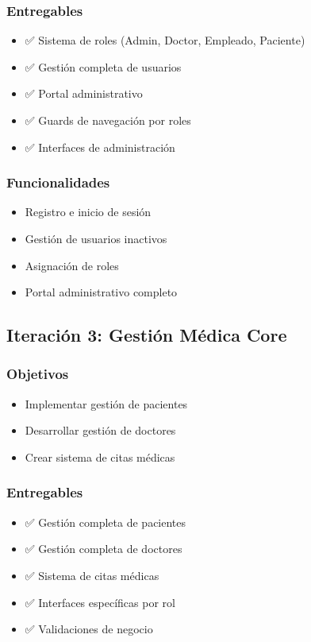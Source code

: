\documentclass[12pt,a4paper]{article}
\begin{document}
\subsubsection{Entregables}
\begin{itemize}
    \item ✅ Sistema de roles (Admin, Doctor, Empleado, Paciente)
    \item ✅ Gestión completa de usuarios
    \item ✅ Portal administrativo
    \item ✅ Guards de navegación por roles
    \item ✅ Interfaces de administración
\end{itemize}

\subsubsection{Funcionalidades}
\begin{itemize}
    \item Registro e inicio de sesión
    \item Gestión de usuarios inactivos
    \item Asignación de roles
    \item Portal administrativo completo
\end{itemize}

\subsection{Iteración 3: Gestión Médica Core}

\subsubsection{Objetivos}
\begin{itemize}
    \item Implementar gestión de pacientes
    \item Desarrollar gestión de doctores
    \item Crear sistema de citas médicas
\end{itemize}

\subsubsection{Entregables}
\begin{itemize}
    \item ✅ Gestión completa de pacientes
    \item ✅ Gestión completa de doctores
    \item ✅ Sistema de citas médicas
    \item ✅ Interfaces específicas por rol
    \item ✅ Validaciones de negocio
\end{itemize}
\end{document}
